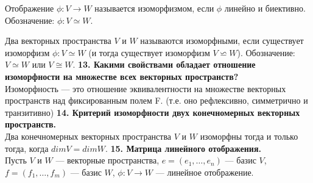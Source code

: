 \documentclass{article}
\begin{document}
Отображение $\phi: V \rightarrow W$ называется изоморфизмом, если $\phi$ линейно и биективно. Обозначение: $\phi : V \simeq  W$.

Два векторных пространства $V$ и $W$ называются изоморфными, если существует изоморфизм $\phi: V \simeq W$ (и тогда существует изоморфизм $V \backsimeq W$). Обозначение: $V \simeq W$ или $V \cong W$.
\newline
\newline
\textbf{13. Какими свойствами обладает отношение изоморфности на множестве всех векторных пространств?}\\
Изоморфность --- это отношение эквивалентности на множестве векторных пространств над фиксированным полем F. (т.е. оно рефлексивно, симметрично и транзитивно)
\newline
\newline
\textbf{14. Критерий изоморфности двух конечномерных векторных пространств.}\\
Два конечномерных векторных пространства $V$ и $W$ изоморфны тогда и только тогда, когда $dim V = dim W$.
\newline
\newline
\textbf{15. Матрица линейного отображения.}\\
Пусть $V$ и $W$ --- векторные пространства, $e = (e_1, \ldots, e_n)$ --- базис $V$, $f = (f_1, \ldots, f_m)$ --- базис $W$, $\phi: V \rightarrow W$ --- линейное отображение.
\end{document}

